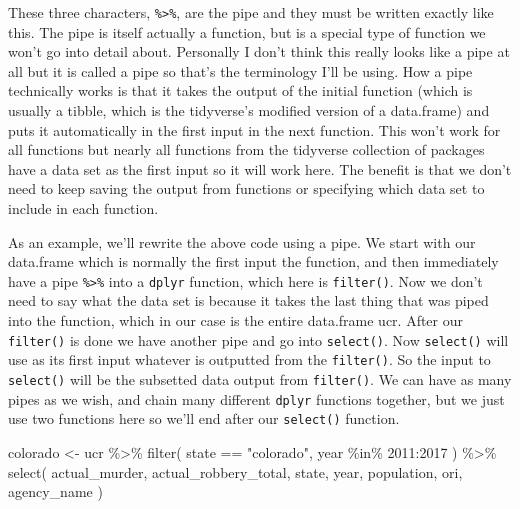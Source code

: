 \documentclass[
]{krantz}
\makeatletter
\newenvironment{Shaded}{\begin{snugshade}}{\end{snugshade}}
\newcommand{\DecValTok}[1]{\textcolor[rgb]{0.06,0.06,0.06}{#1}}
\newcommand{\FunctionTok}[1]{\textcolor[rgb]{0,0,0}{#1}}
\newcommand{\NormalTok}[1]{#1}
\newcommand{\OtherTok}[1]{\textcolor[rgb]{0.37,0.37,0.37}{#1}}
\newcommand{\SpecialCharTok}[1]{\textcolor[rgb]{0,0,0}{#1}}
\newcommand{\StringTok}[1]{\textcolor[rgb]{0.5,0.5,0.5}{#1}}
\newenvironment{kframe}{%
\medskip{}
\setlength{\fboxsep}{.8em}
 \def\at@end@of@kframe{}%
 \ifinner\ifhmode%
  \def\at@end@of@kframe{\end{minipage}}%
  \begin{minipage}{\columnwidth}%
 \fi\fi%
 \def\FrameCommand##1{\hskip\@totalleftmargin \hskip-\fboxsep
 \colorbox{shadecolor}{##1}\hskip-\fboxsep
     \hskip-\linewidth \hskip-\@totalleftmargin \hskip\columnwidth}%
 \MakeFramed {\advance\hsize-\width
   \@totalleftmargin\z@ \linewidth\hsize
   \@setminipage}}%
 {\par\unskip\endMakeFramed%
 \at@end@of@kframe}
\renewenvironment{Shaded}{\begin{kframe}}{\end{kframe}}
\makeatother
\begin{document}
These three characters, \texttt{\%\textgreater{}\%}, are the
pipe and they must be written exactly like this. The pipe is
itself actually a function, but is a special type of
function we won't go into detail about. Personally I don't
think this really looks like a pipe at all but it is called
a pipe so that's the terminology I'll be using. How a pipe
technically works is that it takes the output of the initial
function (which is usually a tibble, which is the
tidyverse's modified version of a data.frame) and puts it
automatically in the first input in the next function. This
won't work for all functions but nearly all functions from
the tidyverse collection of packages have a data set as the
first input so it will work here. The benefit is that we
don't need to keep saving the output from functions or
specifying which data set to include in each function.

As an example, we'll rewrite the above code using a pipe. We
start with our data.frame which is normally the first input
the function, and then immediately have a pipe
\texttt{\%\textgreater{}\%} into a \texttt{dplyr} function,
which here is \texttt{filter()}. Now we don't need to say
what the data set is because it takes the last thing that
was piped into the function, which in our case is the entire
data.frame ucr. After our \texttt{filter()} is done we have
another pipe and go into \texttt{select()}. Now
\texttt{select()} will use as its first input whatever is
outputted from the \texttt{filter()}. So the input to
\texttt{select()} will be the subsetted data output from
\texttt{filter()}. We can have as many pipes as we wish, and
chain many different \texttt{dplyr} functions together, but
we just use two functions here so we'll end after our
\texttt{select()} function.

\begin{Shaded}
\begin{Highlighting}[]
\NormalTok{colorado }\OtherTok{\textless{}{-}}\NormalTok{ ucr }\SpecialCharTok{\%\textgreater{}\%}
  \FunctionTok{filter}\NormalTok{(}
\NormalTok{    state }\SpecialCharTok{==} \StringTok{"colorado"}\NormalTok{,}
\NormalTok{    year }\SpecialCharTok{\%in\%} \DecValTok{2011}\SpecialCharTok{:}\DecValTok{2017}
\NormalTok{  ) }\SpecialCharTok{\%\textgreater{}\%}
  \FunctionTok{select}\NormalTok{(}
\NormalTok{    actual\_murder,}
\NormalTok{    actual\_robbery\_total,}
\NormalTok{    state, year, population,}
\NormalTok{    ori, agency\_name}
\NormalTok{  )}
\end{Highlighting}
\end{Shaded}
\end{document}
